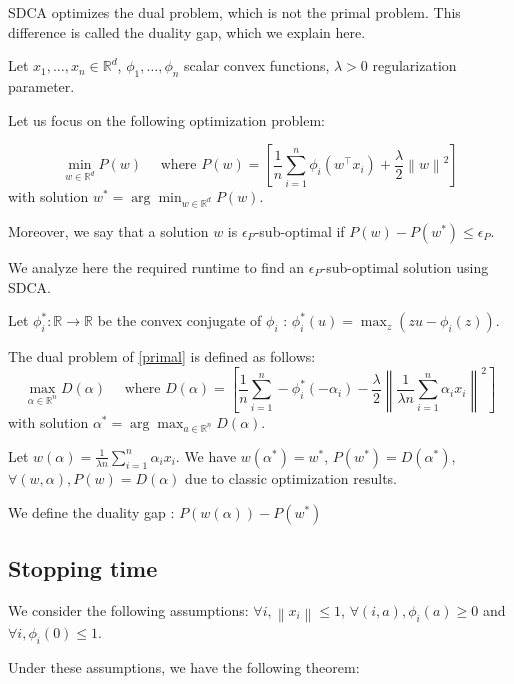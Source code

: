 \documentclass{article}
\newcommand{\norm}[1]{\left\|#1 \right\|}
\begin{document}
SDCA optimizes the dual problem, which is not the primal problem.
This difference is called the duality gap, which we explain here.

Let $x_1, \dots, x_n \in \mathbb{R}^d$, $\phi_1, \dots, \phi_n$ scalar convex functions, $\lambda > 0$ regularization parameter.

Let us focus on the following optimization problem:

\begin{equation}
	\min_{w \in \mathbb{R}^d} P(w) \quad \text{ where } P(w) = \left[ \dfrac{1}{n} \sum_{i=1}^n \phi_i(w^\top x_i) + \dfrac{\lambda}{2}\norm{w}^2 \right]
	\label{primal}
\end{equation}
with solution $w^{*} = \arg \min_{w \in \mathbb{R}^d} P(w)$.

Moreover, we say that a solution $w$ is $\epsilon_P$-sub-optimal if $P(w) - P(w^{*}) \leq \epsilon_P$.

We analyze here the required runtime to find an $\epsilon_P$-sub-optimal solution using SDCA.

Let $\phi_i^{*} : \mathbb{R} \rightarrow \mathbb{R}$ be the convex conjugate of $\phi_i$ : $\phi_i^{*}(u) = \max_z (zu-\phi_i(z))$.

The dual problem of \eqref{primal} is defined as follows:
\begin{equation}
	\max_{\alpha \in \mathbb{R}^n} D(\alpha) \quad \text{ where } D(\alpha) = \left[ \dfrac{1}{n} \sum_{i=1}^n -\phi_i^{*}(-\alpha_i) - \dfrac{\lambda}{2}\norm{\dfrac{1}{\lambda n}\sum_{i=1}^n \alpha_ix_i}^2 \right]
	\label{dual}
\end{equation}
with solution $\alpha^{*} = \arg \max_{a \in \mathbb{R}^n} D(\alpha)$.

Let $w(\alpha) = \frac{1}{\lambda n} \sum_{i=1}^n \alpha_ix_i$.
We have $w(\alpha^{*}) = w^{*}$, $P(w^{*}) = D(\alpha^{*})$, $\forall (w,\alpha), P(w) = D(\alpha)$ due to classic optimization results.

We define the duality gap : $P(w(\alpha)) - P(w^{*})$


\subsection{Stopping time}

We consider the following assumptions: $\forall i, \norm{x_i} \leq 1$, $\forall (i,a), \phi_i(a) \geq 0$ and $\forall i, \phi_i(0) \leq 1$.

Under these assumptions, we have the following theorem:
\end{document}

